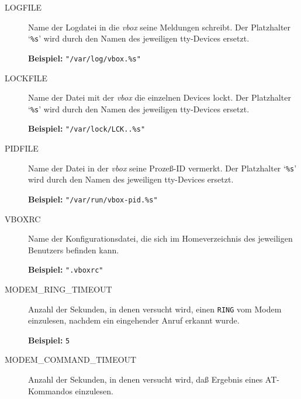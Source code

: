 \begin{description}


\item[LOGFILE] \mbox{}



Name der Logdatei in die {\em vbox\/} seine Meldungen schreibt. Der
Platzhalter `{\tt \%s}' wird durch den Namen des jeweiligen tty-Devices
ersetzt.

{\bf Beispiel:} {\tt "/var/log/vbox.\%s"}



\item[LOCKFILE] \mbox{}



Name der Datei mit der {\em vbox\/} die einzelnen Devices lockt. Der
Platzhalter `{\tt \%s}' wird durch den Namen des jeweiligen tty-Devices
ersetzt.

{\bf Beispiel:} {\tt "/var/lock/LCK..\%s"}



\item[PIDFILE] \mbox{}



Name der Datei in der {\em vbox\/} seine Proze{\ss}-ID vermerkt. Der
Platzhalter `{\tt \%s}' wird durch den Namen des jeweiligen tty-Devices
ersetzt.

{\bf Beispiel:} {\tt "/var/run/vbox-pid.\%s"}



\item[VBOXRC] \mbox{}



Name der Konfigurationsdatei, die sich im Homeverzeichnis des jeweiligen
Benutzers befinden kann.

{\bf Beispiel:} {\tt ".vboxrc"}



\item[MODEM\_RING\_TIMEOUT] \mbox{}



Anzahl der Sekunden, in denen versucht wird, einen {\tt RING} vom
Modem einzulesen, nachdem ein eingehender Anruf erkannt wurde.

{\bf Beispiel:} {\tt 5}



\item[MODEM\_COMMAND\_TIMEOUT] \mbox{}



Anzahl der Sekunden, in denen versucht wird, da{\ss} Ergebnis eines
AT-Kommandos einzulesen.


\end{description}
